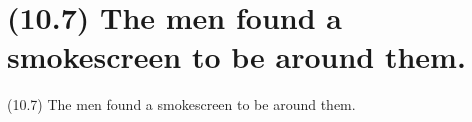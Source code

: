 \documentclass{article}
\begin{document}
\clearpage

%
%

\section*{(10.7) The men found a smokescreen to be around them.}

\bigbreak
\begin{enumerate*}
\item[(10.7)] The men found a smokescreen to be around them.
\end{enumerate*}
\bigbreak
\end{document}
